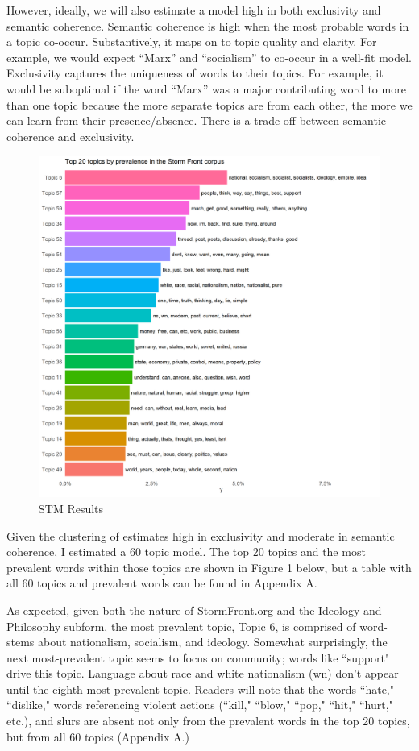 \documentclass[12pt]{paper}
\begin{document}
However, ideally, we will also estimate a model high in both exclusivity and semantic coherence. Semantic coherence is high when the most probable words in a topic co-occur. Substantively, it maps on to topic quality and clarity. For example, we would expect ``Marx” and ``socialism” to co-occur in a well-fit model. Exclusivity captures the uniqueness of words to their topics. For example, it would be suboptimal if the word ``Marx” was a major contributing word to more than one topic because the more separate topics are from each other, the more we can learn from their presence/absence. There is a trade-off between semantic coherence and exclusivity.

\begin{figure} \centering
	\includegraphics[width=.8\linewidth]{figs/top-20.png}
	\caption{STM Results}
	\label{}
\end{figure}

Given the clustering of estimates high in exclusivity and moderate in semantic coherence, I estimated a 60 topic model. The top 20 topics and the most prevalent words within those topics are shown in Figure 1 below, but a table with all 60 topics and prevalent words can be found in Appendix A.

As expected, given both the nature of StormFront.org and the Ideology and Philosophy subform, the most prevalent topic, Topic 6, is comprised of word-stems about nationalism, socialism, and ideology. Somewhat surprisingly, the next most-prevalent topic seems to focus on community; words like ``support" drive this topic. Language about race and white nationalism (wn) don't appear until the eighth most-prevalent topic. Readers will note that the words ``hate," ``dislike," words referencing violent actions (``kill," ``blow," ``pop," ``hit," ``hurt," etc.), and slurs are absent not only from the prevalent words in the top 20 topics, but from all 60 topics (Appendix A.)
\end{document}
